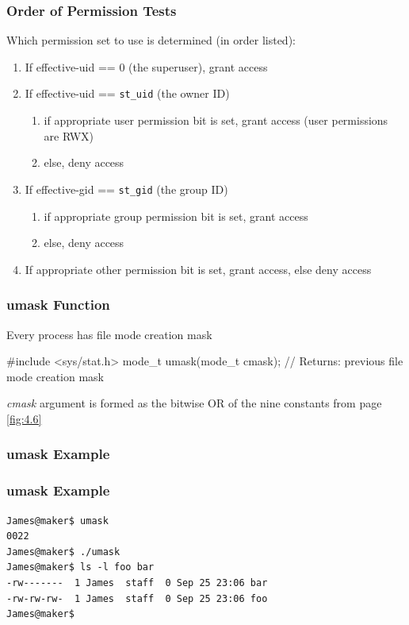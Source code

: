 \documentclass[newPxFont,sthlmFooter,nooffset]{beamer}
\begin{document}
\begin{frame}
  \frametitle{Order of Permission Tests}
Which permission set to use is determined (in order listed):
\begin{enumerate}
\item If effective-uid == 0 (the superuser), grant access
\item If effective-uid == \texttt{st\_uid} (the owner ID)
   \begin{enumerate}
   \item if appropriate user permission bit is set, grant access (user
     permissions are RWX)
   \item else, deny access
   \end{enumerate}
\item If effective-gid == \texttt{st\_gid} (the group ID)
   \begin{enumerate}
   \item if appropriate group permission bit is set, grant access
   \item else, deny access
   \end{enumerate}
\item If appropriate other permission bit is set, grant access, else deny access
\end{enumerate}
\end{frame}



\begin{frame}[containsverbatim,t]
  \frametitle{umask Function}
Every process has file mode creation mask

\begin{codedef}
#include <sys/stat.h> 
mode_t umask(mode_t cmask);
// Returns: previous file mode creation mask  
\end{codedef}

\textit{cmask} argument is formed as the bitwise OR of the nine constants from page \ref{fig:4.6}
\end{frame}


\begin{frame}[containsverbatim,t]
  \frametitle{umask Example}

\end{frame}


\begin{frame}[containsverbatim,t]
  \frametitle{umask Example}
{\footnotesize
\begin{verbatim}
James@maker$ umask
0022
James@maker$ ./umask
James@maker$ ls -l foo bar
-rw-------  1 James  staff  0 Sep 25 23:06 bar
-rw-rw-rw-  1 James  staff  0 Sep 25 23:06 foo
James@maker$
\end{verbatim}
}
\end{frame}
\end{document}
